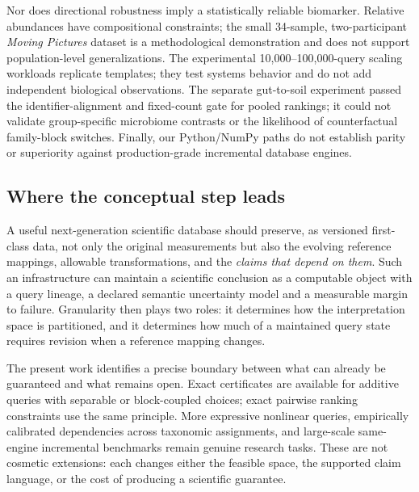 \documentclass[conference]{IEEEtran}
\begin{document}
Nor does directional robustness imply a statistically reliable biomarker. Relative abundances have compositional constraints; the small 34-sample, two-participant \emph{Moving Pictures} dataset is a methodological demonstration and does not support population-level generalizations. The experimental 10,000--100,000-query scaling workloads replicate templates; they test systems behavior and do not add independent biological observations. The separate gut-to-soil experiment passed the identifier-alignment and fixed-count gate for pooled rankings; it could not validate group-specific microbiome contrasts or the likelihood of counterfactual family-block switches. Finally, our Python/NumPy paths do not establish parity or superiority against production-grade incremental database engines.

\subsection{Where the conceptual step leads}
A useful next-generation scientific database should preserve, as versioned first-class data, not only the original measurements but also the evolving reference mappings, allowable transformations, and the \emph{claims that depend on them}. Such an infrastructure can maintain a scientific conclusion as a computable object with a query lineage, a declared semantic uncertainty model and a measurable margin to failure. Granularity then plays two roles: it determines how the interpretation space is partitioned, and it determines how much of a maintained query state requires revision when a reference mapping changes.

The present work identifies a precise boundary between what can already be guaranteed and what remains open. Exact certificates are available for additive queries with separable or block-coupled choices; exact pairwise ranking constraints use the same principle. More expressive nonlinear queries, empirically calibrated dependencies across taxonomic assignments, and large-scale same-engine incremental benchmarks remain genuine research tasks. These are not cosmetic extensions: each changes either the feasible space, the supported claim language, or the cost of producing a scientific guarantee.
\end{document}
